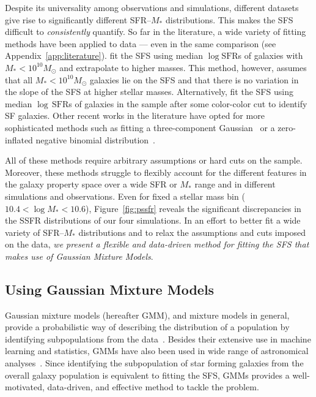 \documentclass[preprint2,tighten]{aastex62}
\begin{document}
Despite its universality among observations and simulations, 
different datasets give rise to significantly different SFR--$M_*$ 
distributions. This makes the SFS difficult to \emph{consistently} 
quantify. So far in the literature, a wide variety of fitting 
methods have been applied to data --- even in the same comparison 
(see Appendix~\ref{app:literature}). \cite{bluck2016} fit the SFS 
using median $\log\mathrm{SFR}$s of galaxies with $M_* < 10^{10}M_\odot$ 
and extrapolate to higher masses. This method, however, assumes that 
all $M_* < 10^{10}M_\odot$ galaxies lie on the SFS and that there 
is no variation in the slope of the SFS at higher stellar masses. 
Alternatively, \cite{lee2015} fit the SFS using median 
$\log\,\mathrm{SFR}$s of galaxies in the sample after some color-color 
cut to identify SF galaxies. Other recent works in the literature have opted 
for more sophisticated methods such as fitting a three-component
Gaussian~\citep{bisigello2018} or a zero-inflated negative binomial 
distribution~\citep{feldmann2017}. 

All of these methods require arbitrary assumptions or hard cuts on the 
sample. Moreover, these methods struggle to flexibly account for 
the different features in the galaxy property space over a wide 
SFR or $M_*$ range and in different simulations and observations. %
Even for fixed a stellar mass bin ($10.4 < \log M_* < 10.6$), 
Figure~\ref{fig:pssfr} reveals the significant discrepancies in 
the SSFR distributions of our four simulations. In an effort to 
better fit a wide variety of SFR--$M_*$ distributions and to relax the assumptions and cuts imposed 
on the data, \emph{we present a flexible and data-driven method for 
fitting the SFS that makes use of Gaussian Mixture Models}.

\subsection{Using Gaussian Mixture Models}
Gaussian mixture models (hereafter GMM), and mixture models in general, provide 
a probabilistic way of describing the distribution of a population by 
identifying subpopulations from the data~\citep[][]{Press:1992:NRC:148286, 9780471006268}.
Besides their extensive use in machine learning and statistics, 
GMMs have also been used in wide range of astronomical analyses~\citep[\emph{e.g.}][]{bovy2011,lee2012,taylor2015}. 
Since identifying the subpopulation of star forming galaxies from the overall
galaxy population is equivalent to fitting the SFS, GMMs provides a 
well-motivated, data-driven, and effective method to tackle the problem. 
\end{document}
